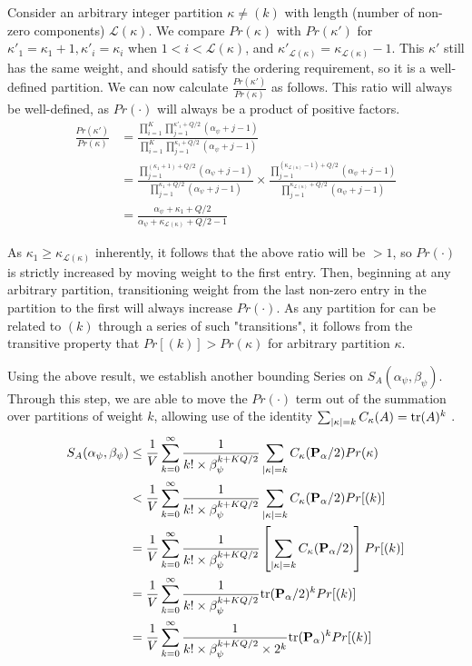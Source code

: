 \documentclass[12pt]{article}
\begin{document}
Consider an arbitrary integer partition $\kappa \neq (k)$ with length (number of non-zero components) $\mathcal{L}(\kappa)$. We compare $Pr(\kappa)$ with $Pr(\kappa')$ for $\kappa'_1 = \kappa_1 + 1, \kappa'_i = \kappa_i$ when $1 < i < \mathcal{L}(\kappa)$, and $\kappa'_{\mathcal{L}(\kappa)} = \kappa_{\mathcal{L}(\mathcal{\kappa})} - 1$. This $\kappa'$ still has the same weight, and should satisfy the ordering requirement, so it is a well-defined partition. We can now calculate $\frac{Pr(\kappa')}{Pr(\kappa)}$ as follows. This ratio will always be well-defined, as $Pr(\cdot)$ will always be a product of positive factors.
\begin{align*}
    \frac{Pr(\kappa')}{Pr(\kappa)} & = \frac{\prod_{i = 1}^K\prod_{j = 1}^{\kappa'_i + Q/2}(\alpha_\psi + j - 1)}{\prod_{i = 1}^K\prod_{j = 1}^{\kappa_i + Q/2}(\alpha_\psi + j - 1)}\\
    & = \frac{\prod_{j = 1}^{(\kappa_1 + 1) +Q/2}(\alpha_\psi + j - 1)}{\prod_{j =1}^{\kappa_1 + Q/2}(\alpha_\psi + j - 1)} \times \frac{\prod_{j = 1}^{(\kappa_{\mathcal{L}(\kappa)} - 1) +Q/2}(\alpha_\psi + j - 1)}{\prod_{j =1}^{\kappa_{\mathcal{L}(\kappa)} + Q/2}(\alpha_\psi + j - 1)}\\
    & = \frac{\alpha_\psi + \kappa_1 + Q/2}{\alpha_\psi + \kappa_{\mathcal{L}(\kappa)} + Q/2 - 1}
\end{align*}

As $\kappa_1 \geq \kappa_{\mathcal{L(\kappa)}}$ inherently, it follows that the above ratio will be $> 1$, so $Pr(\cdot)$ is strictly increased by moving weight to the first entry. Then, beginning at any arbitrary partition, transitioning weight from the last non-zero entry in the partition to the first will always increase $Pr(\cdot)$. As any partition for can be related to $(k)$ through a series of such "transitions", it follows from the transitive property that $Pr[(k)] > Pr(\kappa)$ for arbitrary partition $\kappa$.

Using the above result, we establish another bounding Series on $S_A(\alpha_\psi, \beta_\psi)$. Through this step, we are able to move the $Pr(\cdot)$ term out of the summation over partitions of weight $k$, allowing use of the identity $\sum_{|\kappa| = k} C_\kappa(A) = {\rm tr}(A)^k$ \citep{bagyan_complete_2024}.
\begin{align*}
    S_A(\alpha_\psi, \beta_\psi) & \leq \frac{1}{V}\sum_{k = 0}^\infty \frac{1}{k! \times \beta_\psi^{k + KQ/2}} \sum_{|\kappa| = k} C_\kappa(\mathbf{P}_\alpha/2) Pr(\kappa)\\
    & < \frac{1}{V}\sum_{k = 0}^\infty \frac{1}{k! \times \beta_\psi^{k + KQ/2}} \sum_{|\kappa| = k} C_\kappa(\mathbf{P}_\alpha/2) Pr[(k)]\\
    & = \frac{1}{V}\sum_{k = 0}^\infty \frac{1}{k! \times \beta_\psi^{k + KQ/2}} \left[\sum_{|\kappa| = k} C_\kappa(\mathbf{P}_\alpha/2) \right] Pr[(k)]\\
    & = \frac{1}{V}\sum_{k = 0}^\infty \frac{1}{k! \times \beta_\psi^{k + KQ/2}} {\rm tr}(\mathbf{P}_\alpha/2)^k Pr[(k)]\\
    & = \frac{1}{V}\sum_{k = 0}^\infty \frac{1}{k! \times \beta_\psi^{k + KQ/2} \times 2^k} {\rm tr}(\mathbf{P}_\alpha)^k Pr[(k)]
\end{align*}
\end{document}
